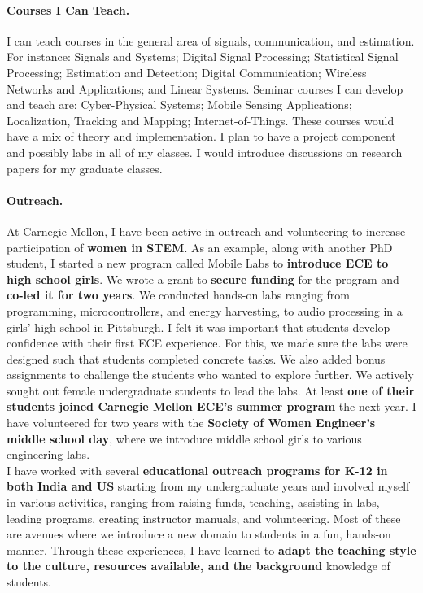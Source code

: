 \documentclass[10pt]{article}
\begin{document}
\paragraph{Courses I Can Teach. }
I can teach courses in the general area of signals, communication, and estimation. For instance: 
Signals and Systems; Digital Signal Processing; Statistical Signal Processing; Estimation and Detection; Digital Communication; Wireless Networks and Applications; and Linear Systems. 
Seminar courses I can develop and teach are: Cyber-Physical Systems; Mobile Sensing Applications; Localization, Tracking and Mapping; Internet-of-Things. These courses would have a mix of theory and implementation. I plan to have a project component and possibly labs in all of my classes. I would introduce discussions on research papers for my graduate classes.



 \paragraph{Outreach. } 
 At Carnegie Mellon, I have been active in outreach and volunteering to increase participation of \textbf{women in STEM}. %
As an example, along with another PhD student, I started a new program called Mobile Labs to \textbf{introduce ECE to high school girls}. We wrote a grant to \textbf{secure funding} for the program and \textbf{co-led it for two years}. We conducted hands-on labs ranging from programming, microcontrollers, and energy harvesting, to audio processing in a girls' high school in Pittsburgh. I felt it was important that students develop confidence with their first ECE experience. For this, we made sure the labs were designed such that students completed concrete tasks. %
We also added bonus assignments to challenge the students who wanted to explore further. We actively sought out female undergraduate students to lead the labs. At least \textbf{one of their students joined Carnegie Mellon ECE's summer program} the next year. I have volunteered for two years with the \textbf{Society of Women Engineer's middle school day}, where we introduce middle school girls to various engineering labs.\\

I have worked with several \textbf{educational outreach programs for K-12 in both India and US} starting from my undergraduate years and involved myself in various activities, ranging from raising funds, teaching, assisting in labs, leading programs, creating instructor manuals, and volunteering. Most of these are avenues where we introduce a new domain to students in a fun, hands-on manner. Through these experiences, I have learned to \textbf{adapt the teaching style to the culture, resources available, and the background} knowledge of students. \\
\end{document}
